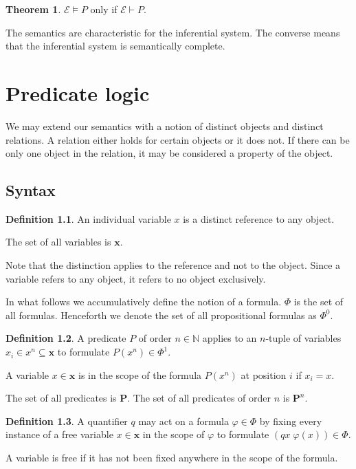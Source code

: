 \documentclass{amsbook}
\newcommand{\infers}{\mathrel\vdash}
\newcommand{\valids}{\mathrel\vDash}
\theoremstyle{definition}
\newtheorem{thm}{Theorem}[section]
\newtheorem{dfn}{Definition}[section]
\begin{document}
\begin{thm}
    $\mathcal E \valids P$ only if $\mathcal E \infers P$.

    The semantics are characteristic for the inferential system. The converse means that the inferential system is semantically complete.
\end{thm}

\chapter{Predicate logic}

We may extend our semantics with a notion of distinct objects and distinct relations. A relation either holds for certain objects or it does not. If there can be only one object in the relation, it may be considered a property of the object.

\section{Syntax}

\begin{dfn}
    An individual variable $x$ is a distinct reference to any object.

    The set of all variables is $\mathbf x$.
\end{dfn}

Note that the distinction applies to the reference and not to the object. Since a variable refers to any object, it refers to no object exclusively.

In what follows we accumulatively define the notion of a formula. $\Phi$ is the set of all formulas. Henceforth we denote the set of all propositional formulas as $\Phi^0$.

\begin{dfn}
    A predicate $P$ of order $n \in \mathbb N$ applies to an $n$-tuple of variables $x_i \in x^n \subseteq \mathbf x$ to formulate $P(x^n) \in \Phi^1$.

    A variable $x \in \mathbf x$ is in the scope of the formula $P(x^n)$ at position $i$ if $x_i = x$.

    The set of all predicates is $\mathbf P$.  The set of all predicates of order $n$ is $\mathbf P^n$.
\end{dfn}

\begin{dfn}
    A quantifier $q$ may act on a formula $\varphi \in \Phi$ by fixing every instance of a free variable $x \in \mathbf x$ in the scope of $\varphi$ to formulate $(qx\;\varphi(x)) \in \Phi$.

    A variable is free if it has not been fixed anywhere in the scope of the formula.
\end{dfn}
\end{document}

